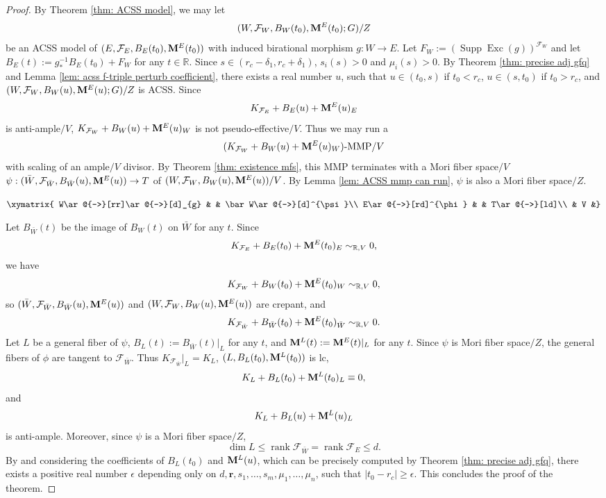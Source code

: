 \documentclass[11pt]{amsart}
\numberwithin{equation}{section}
\newcommand{\Mm}{{\bf{M}}}
\newcommand{\Exc}{\operatorname{Exc}}
\newcommand{\rk}{\operatorname{rank}}
\newcommand{\Supp}{\operatorname{Supp}}
\newcommand{\Ff}{\mathcal{F}}
\theoremstyle{definition}
\theoremstyle{definition}
\theoremstyle{definition}
\begin{document}
\begin{proof}
By Theorem \ref{thm:  ACSS model}, we may let $$(W,\Ff_W,B_W(t_0),\Mm^E(t_0);G)/Z$$ be an ACSS model of $(E,\Ff_E,B_E(t_0),\Mm^E(t_0))$ with induced birational morphism $g: W\rightarrow E$. Let $F_W:=(\Supp\Exc(g))^{\Ff_W}$ and let $B_E(t):=g_*^{-1}B_E(t_0)+F_W$ for any $t\in\mathbb R$. Since $s\in (r_c-\delta_1,r_c+\delta_1)$, $s_i(s)>0$ and $\mu_i(s)>0$. By Theorem \ref{thm: precise adj gfq} and Lemma \ref{lem: acss f-triple perturb coefficient}, there exists a real number $u$, such that $u\in (t_0,s)$ if $t_0<r_c$, $u\in (s,t_0)$ if $t_0>r_c$, and 
$(W,\Ff_W,B_W(u),\Mm^E(u);G)/Z$
is ACSS. Since
$$K_{\Ff_E}+B_E(u)+\Mm^E(u)_E$$ is anti-ample$/V$,
$K_{\Ff_W}+B_W(u)+\Mm^E(u)_W$ is not pseudo-effective$/V$. Thus we may run a 
$$(K_{\Ff_W}+B_W(u)+\Mm^E(u)_W)\text{-MMP}/V$$
with scaling of an ample$/V$ divisor. By Theorem \ref{thm: existence mfs}, this MMP terminates with a Mori fiber space$/V$ $\psi: (\bar W,\Ff_{\bar W},B_{\bar W}(u),\Mm^E(u))\rightarrow T$ of $(W,\Ff_{W},B_{W}(u),\Mm^E(u))/V$. By Lemma \ref{lem: ACSS mmp can run}, $\psi$ is also a Mori fiber space$/Z$. 
\begin{center}$\xymatrix{
W\ar@{-->}[rr]\ar@{->}[d]_{g} &  & \bar W\ar@{->}[d]^{\psi}\\
E\ar@{->}[rd]^{\phi} & & T\ar@{->}[ld]\\
& V &}$
\end{center}

Let $B_{\bar W}(t)$ be the image of $B_W(t)$ on $\bar W$ for any $t$. Since 
$$K_{\Ff_E}+B_E(t_0)+\Mm^E(t_0)_E\sim_{\mathbb R,V}0,$$
we have
$$K_{\Ff_W}+B_W(t_0)+\Mm^E(t_0)_W\sim_{\mathbb R,V}0,$$
so $(\bar W,\Ff_{\bar W},B_{\bar W}(u),\Mm^E(u))$ and $(W,\Ff_{W},B_{W}(u),\Mm^E(u))$ are crepant, and
$$K_{\Ff_{\bar W}}+B_{\bar W}(t_0)+\Mm^E(t_0)_{\bar W}\sim_{\mathbb R,V}0.$$
Let $L$ be a general fiber of $\psi$, $B_L(t):=B_{\bar W}(t)|_L$ for any $t$, and $\Mm^L(t):=\Mm^E(t)|_L$ for any $t$. Since $\psi$ is  Mori fiber space$/Z$, the general fibers of $\phi$ are tangent to $\Ff_{\bar W}$. Thus $K_{\Ff_{\bar W}}|_L=K_L$, $(L,B_L(t_0),\Mm^L(t_0))$ is lc,
$$K_L+B_L(t_0)+\Mm^L(t_0)_L\equiv 0,$$
and
$$K_L+B_L(u)+\Mm^L(u)_L$$
is anti-ample. Moreover, since $\psi$ is a Mori fiber space$/Z$, 
$$\dim L\leq\rk\Ff_{\bar W}=\rk\Ff_{E}\leq d.$$
By \cite[Theorem 3.6]{Che20} and considering the coefficients of $B_L(t_0)$ and $\Mm^L(u)$, which can be precisely computed by Theorem \ref{thm: precise adj gfq}, there exists a positive real number $\epsilon$ depending only on $d,\bm{r},s_1,\dots,s_m,\mu_1,\dots,\mu_n$, such that $|t_0-r_c|\geq\epsilon$. This concludes the proof of the theorem.
\end{proof}
\end{document}
